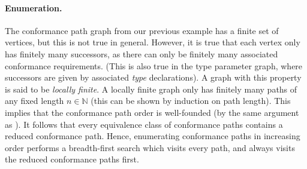 \documentclass[../generics]{subfiles}
\begin{document}
\paragraph{Enumeration.} The conformance path graph from our previous example has a finite set of vertices, but this is not true in general. However, it is true that each vertex only has finitely many successors, as there can only be finitely many associated conformance requirements. (This is also true in the type parameter graph, where successors are given by associated \emph{type} declarations). A graph with this property is said to be \emph{locally finite}. A locally finite graph only has finitely many paths of any fixed length $n\in\mathbb{N}$ (this can be shown by induction on path length). This implies that the conformance path order is well-founded (by the same argument as ). It follows that every equivalence class of conformance paths contains a reduced conformance path. Hence, enumerating conformance paths in increasing order performs a breadth-first search which visits every path, and always visits the reduced conformance paths first.
\end{document}
